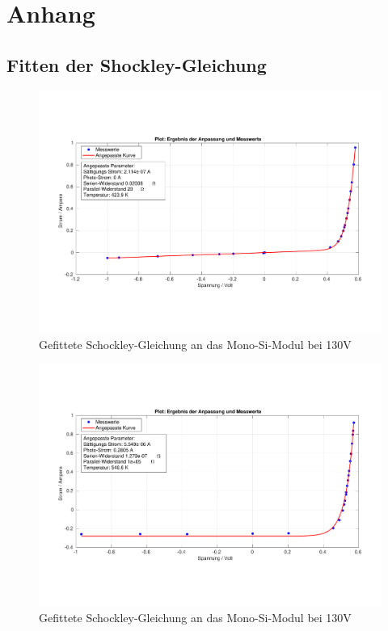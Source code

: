 

\chapter{Anhang}
\label{chap:anhangA}

\section{Fitten der Shockley-Gleichung}

\begin{figure}[ht]
    \centering
    \includegraphics[width = \linewidth]{Bilder/SiMonoDunkelPlot.pdf}
    \caption{Gefittete Schockley-Gleichung an das Mono-Si-Modul bei 130V}
\end{figure}
\begin{figure}[ht]
    \centering
    \includegraphics[width = \linewidth]{Bilder/SiMulti130Plot.pdf}
    \caption{Gefittete Schockley-Gleichung an das Mono-Si-Modul bei 130V}
\end{figure}
